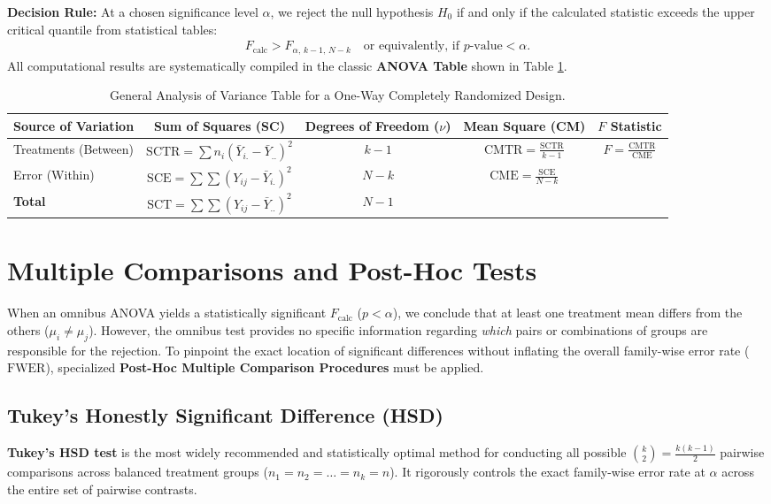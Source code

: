 \textbf{Decision Rule:} At a chosen significance level $\alpha$, we reject the null hypothesis $H_0$ if and only if the calculated statistic exceeds the upper critical quantile from statistical tables:
\begin{align}
	F_{\text{calc}} > F_{\alpha, \, k-1, \, N-k} \quad \text{or equivalently, if } p\text{-value} < \alpha.
\end{align}
All computational results are systematically compiled in the classic \textbf{ANOVA Table} shown in Table \ref{tab:anova_un_factor}.

\begin{table}[htbp]
	\centering
	\caption{General Analysis of Variance Table for a One-Way Completely Randomized Design.}
	\label{tab:anova_un_factor}
	\begin{tabular}{lcccc}
		\hline
		\textbf{Source of Variation} & \textbf{Sum of Squares (SC)} & \textbf{Degrees of Freedom ($\nu$)} & \textbf{Mean Square (CM)} & \textbf{$F$ Statistic} \\ \hline
		Treatments (Between) & $\text{SCTR} = \sum n_i(\bar{Y}_{i.} - \bar{Y}_{..})^2$ & $k - 1$ & $\text{CMTR} = \frac{\text{SCTR}}{k-1}$ & $F = \frac{\text{CMTR}}{\text{CME}}$ \\
		Error (Within) & $\text{SCE} = \sum \sum (Y_{ij} - \bar{Y}_{i.})^2$ & $N - k$ & $\text{CME} = \frac{\text{SCE}}{N-k}$ & \\ \hline
		\textbf{Total} & $\text{SCT} = \sum \sum (Y_{ij} - \bar{Y}_{..})^2$ & $N - 1$ & & \\ \hline
	\end{tabular}
\end{table}

\section*{Multiple Comparisons and Post-Hoc Tests}

When an omnibus ANOVA yields a statistically significant $F_{\text{calc}}$ ($p < \alpha$), we conclude that at least one treatment mean differs from the others ($\mu_i \neq \mu_j$). However, the omnibus test provides no specific information regarding \emph{which} pairs or combinations of groups are responsible for the rejection. To pinpoint the exact location of significant differences without inflating the overall family-wise error rate ($\text{FWER}$), specialized \textbf{Post-Hoc Multiple Comparison Procedures} must be applied.

\subsection*{Tukey's Honestly Significant Difference (HSD)}
\textbf{Tukey's HSD test} is the most widely recommended and statistically optimal method for conducting all possible $\binom{k}{2} = \frac{k(k-1)}{2}$ pairwise comparisons across balanced treatment groups ($n_1 = n_2 = \dots = n_k = n$). It rigorously controls the exact family-wise error rate at $\alpha$ across the entire set of pairwise contrasts.

